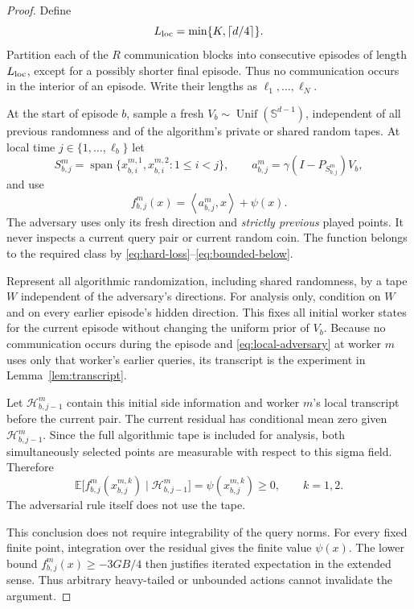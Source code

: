 \documentclass[11pt,a4paper]{article}
\numberwithin{equation}{section}
\theoremstyle{remark}
\newcommand{\E}{\mathbb E}
\newcommand{\ip}[2]{\left\langle #1,#2\right\rangle}
\newcommand{\Sph}{\mathbb S^{d-1}}
\DeclareMathOperator{\spanop}{span}
\DeclareMathOperator{\Unif}{Unif}
\begin{document}
\begin{proof}
Define
\[
 L_{\rm loc}=\min\{K,\lceil d/4\rceil\}.
\]
Partition each of the $R$ communication blocks into consecutive episodes
of length $L_{\rm loc}$, except for a possibly shorter final episode.
Thus no communication occurs in the interior of an episode. Write
their lengths as $\ell_1,\ldots,\ell_N$.

At the start of episode $b$, sample a fresh
$V_b\sim\Unif(\Sph)$, independent of all previous randomness and of the
algorithm's private or shared random tapes. At local time
$j\in\{1,\ldots,\ell_b\}$ let
\[
 S_{b,j}^m=\spanop\{x_{b,i}^{m,1},x_{b,i}^{m,2}:1\le i<j\},
\qquad
 a_{b,j}^m=\gamma(I-P_{S_{b,j}^m})V_b,
\]
and use
\begin{equation}
 f_{b,j}^m(x)=\ip{a_{b,j}^m}{x}+\psi(x).
 \label{eq:local-adversary}
\end{equation}
The adversary uses only its fresh direction and \emph{strictly previous}
played points. It never inspects a current query pair or current random
coin. The function belongs to the required class by
\eqref{eq:hard-loss}--\eqref{eq:bounded-below}.

Represent all algorithmic randomization, including shared randomness,
by a tape $W$ independent of the adversary's directions. For analysis
only, condition on $W$ and on every earlier episode's hidden direction.
This fixes all initial worker states for the current episode without
changing the uniform prior of $V_b$.
Because no communication occurs during the episode and
\eqref{eq:local-adversary} at worker $m$ uses only that worker's earlier
queries, its transcript is the experiment in
Lemma~\ref{lem:transcript}.

Let $\mathcal H_{b,j-1}^m$ contain this initial side information and
worker $m$'s local transcript before the current pair.
The current residual has conditional mean zero given
$\mathcal H_{b,j-1}^m$. Since the full algorithmic tape is included for
analysis, both simultaneously selected points are measurable with
respect to this sigma field. Therefore
\begin{equation}
 \E\bigl[f_{b,j}^m(x_{b,j}^{m,k})\mid\mathcal H_{b,j-1}^m\bigr]
 =\psi(x_{b,j}^{m,k})\ge0,\qquad k=1,2.
 \label{eq:nonnegative-charged}
\end{equation}
The adversarial rule itself does not use the tape.

This conclusion does not require integrability of the query norms.
For every fixed finite point, integration over the residual gives the
finite value $\psi(x)$. The lower bound
$f_{b,j}^m(x)\ge-3GB/4$ then justifies iterated expectation in the
extended sense. Thus arbitrary heavy-tailed or unbounded actions
cannot invalidate the argument.


\end{proof}
\end{document}
